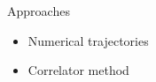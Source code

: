 \documentclass[aspectratio=169,11pt,usenames,dvipsnames]{beamer}
\begin{document}
\begin{frame}{}
\begin{center}
{\begin{center}
\begin{columns}
\begin{column}{0.35\textwidth}
                    {\Large\color{ming} Approaches}
                    \begin{itemize}
                        \item Numerical trajectories
                        \item Correlator method
                    \end{itemize}
                \end{column}
                \begin{column}{0.066\textwidth}\end{column}
            \end{columns}
        \end{center}
        }
    \end{center}
\end{frame}
\end{document}
